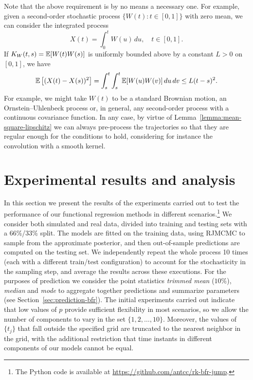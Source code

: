 Note that the above requirement is by no means a necessary one. For example, given a second-order stochastic process \(\{W(t): t \in [0,1]\}\) with zero mean, we can consider the integrated process
\[
  X(t)=\int_0^t W(u)\, du, \quad t\in [0,1].
\]
If \(K_W(t,s)=\mathbb{E}[W(t)W(s)]\) is uniformly bounded above by a constant \(L>0\) on \([0,1]\), we have
\[
  \mathbb{E}\left[(X(t) - X(s))^2\right] = \int_s^t \int_s^t \mathbb{E}[W(u)W(v)]\, du\,dv \leq L(t-s)^2.
\]
For example, we might take \(W(t)\) to be a standard Brownian motion, an Ornstein--Uhlenbeck process or, in general, any second-order process with a continuous covariance function. In any case, by virtue of Lemma~\ref{lemma:mean-square-lipschitz} we can always pre-process the trajectories so that they are regular enough for the conditions to hold, considering for instance the convolution with a smooth kernel.


\section{Experimental results and analysis}\label{sec:results-bfr}

In this section we present the results of the experiments carried out to test the performance of our functional regression methods in different scenarios.\footnote{The Python code is available at \url{https://github.com/antcc/rk-bfr-jump}.} We consider both simulated and real data, divided into training and testing sets with a 66\%/33\% split. The models are fitted on the training data, using \acs{RJMCMC} to sample from the approximate posterior, and then out-of-sample predictions are computed on the testing set. We independently repeat the whole process 10 times (each with a different train/test configuration) to account for the stochasticity in the sampling step, and average the results across these executions. For the purposes of prediction we consider the point statistics \textit{trimmed mean} (\(10\%\)), \textit{median} and \textit{mode} to aggregate together predictions and summarize parameters (see Section~\ref{sec:prediction-bfr}). The initial experiments carried out indicate that low values of \(p\) provide sufficient flexibility in most scenarios, so we allow the number of components to vary in the set \(\{1,2,\dots,10\}\). Moreover, the values of \(\{t_j\}\) that fall outside the specified grid are truncated to the nearest neighbor in the grid, with the additional restriction that time instants in different components of our models cannot be equal.


